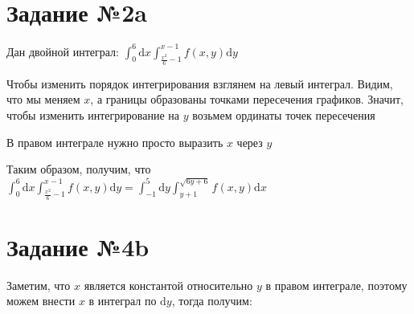 \documentclass[a4paper, 10pt]{article}
\renewcommand{\d}[1]{\text{d}#1}
\begin{document}
\section*{Задание №2a}
Дан двойной интеграл: $\displaystyle\int_0^6\d{x}\int_{\frac{x^2}{6}-1}^{x-1}f(x,y)\d{y}$

Чтобы изменить порядок интегрирования взглянем на левый интеграл. Видим, что мы меняем $x$, а границы образованы точками пересечения графиков. Значит, чтобы изменить интегрирование на $y$ возьмем ординаты точек пересечения

В правом интеграле нужно просто выразить $x$ через $y$


Таким образом, получим, что $\displaystyle\int_0^6\d{x}\int_{\frac{x^2}{6}-1}^{x-1}f(x,y)\d{y}=\displaystyle\int_{-1}^{5}\d{y}\int_{y+1}^{\sqrt{6y+6}}f(x,y)\d{x}$

\section*{Задание №4b}
Заметим, что $x$ является константой относительно $y$ в правом интеграле, поэтому можем внести $x$ в интеграл по $\d{y}$, тогда получим:
\end{document}
